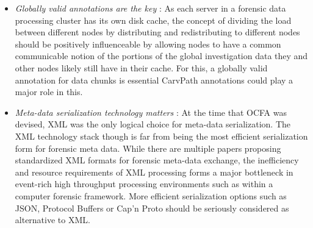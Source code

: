 \begin{itemize}
\item \emph{Globally valid annotations are the key} : As each server in a forensic data processing cluster has its own disk cache, the concept of dividing the load between different nodes by distributing and redistributing to different nodes should be positively influenceable by allowing nodes to have a common communicable notion of the portions of the global investigation data they and other nodes likely still have in their cache. For this, a globally valid annotation for data chunks is essential CarvPath annotations could play a major role in this.
\item \emph{Meta-data serialization technology matters} : At the time that OCFA was devised, XML was the only logical choice for meta-data serialization. The XML technology stack though is far from being the most efficient serialization form for forensic meta data. While there are multiple papers proposing standardized XML formats for forensic meta-data exchange, the inefficiency and resource requirements of XML processing forms a major bottleneck in event-rich high throughput processing environments such as within a computer forensic framework. More efficient serialization options such as JSON, Protocol Buffers or Cap'n Proto should be seriously considered as alternative to XML. 

\end{itemize}
